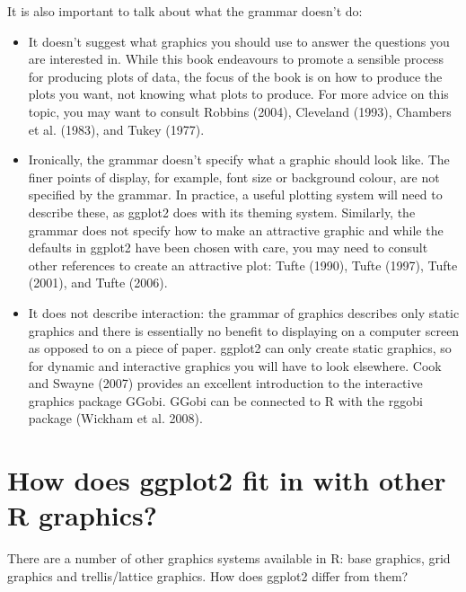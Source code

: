 It is also important to talk about what the grammar doesn't do:

\begin{itemize}
\item
  It doesn't suggest what graphics you should use to answer the
  questions you are interested in. While this book endeavours to promote
  a sensible process for producing plots of data, the focus of the book
  is on how to produce the plots you want, not knowing what plots to
  produce. For more advice on this topic, you may want to consult
  Robbins (2004), Cleveland (1993), Chambers et al. (1983), and Tukey
  (1977).
\item
  Ironically, the grammar doesn't specify what a graphic should look
  like. The finer points of display, for example, font size or
  background colour, are not specified by the grammar. In practice, a
  useful plotting system will need to describe these, as ggplot2 does
  with its theming system. Similarly, the grammar does not specify how
  to make an attractive graphic and while the defaults in ggplot2 have
  been chosen with care, you may need to consult other references to
  create an attractive plot: Tufte (1990), Tufte (1997), Tufte (2001),
  and Tufte (2006).
\item
  It does not describe interaction: the grammar of graphics describes
  only static graphics and there is essentially no benefit to displaying
  on a computer screen as opposed to on a piece of paper. ggplot2 can
  only create static graphics, so for dynamic and interactive graphics
  you will have to look elsewhere. Cook and Swayne (2007) provides an
  excellent introduction to the interactive graphics package GGobi.
  GGobi can be connected to R with the rggobi package (Wickham et al.
  2008).
\end{itemize}

\section{How does ggplot2 fit in with other R graphics?}

There are a number of other graphics systems available in R: base
graphics, grid graphics and trellis/lattice graphics. How does ggplot2
differ from them?

